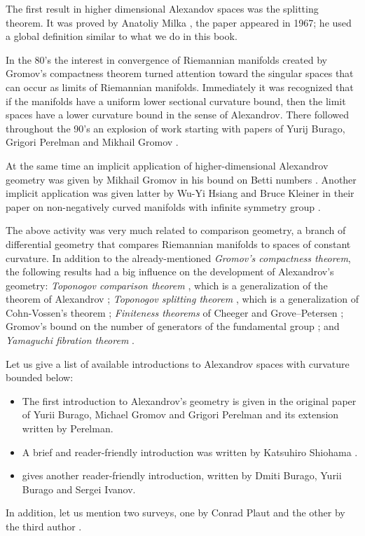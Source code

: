 The first result in higher dimensional Alexandov spaces was the splitting theorem.
It was proved by Anatoliy Milka \cite{milka-line}, the paper appeared in 1967;
he used a global definition similar to what we do in this book.

In the 80's the interest in convergence of Riemannian manifolds created by Gromov's compactness theorem \cite{gromov-MS} turned attention toward the singular spaces that can occur as limits of Riemannian manifolds.
Immediately it was recognized that if the manifolds have a uniform lower sectional curvature bound, then the limit spaces have a lower curvature bound in the sense of Alexandrov. 
There followed throughout the 90's an explosion of work starting with papers of Yurij Burago, Grigori Perelman and Mikhail Gromov  \cite{BGP,perelman:spaces2}.

At the same time an implicit application of higher-dimensional Alexandrov geometry was given by Mikhail Gromov in his bound on Betti numbers \cite{gromov:betti}.
Another implicit application was given latter by Wu-Yi Hsiang and Bruce Kleiner in their paper on non-negatively curved manifolds with infinite symmetry group \cite{hsiang-kleiner}.

The above activity was very much related to comparison geometry,
a branch of differential geometry that compares Riemannian manifolds  to  spaces of constant curvature.
In addition to the already-mentioned \emph{Gromov's compactness theorem},
the following results had a big influence on the development of Alexandrov's geometry:
\emph{Toponogov comparison theorem} \cite{toponogov-globalization+splitting}, which is a generalization of the theorem of Alexandrov \cite{alexandrov-comparison};
\emph{Toponogov splitting theorem} \cite{toponogov-globalization+splitting}, which is a generalization of Cohn-Vossen's theorem \cite{cohn-vossen_line};
\emph{Finiteness theorems} of
Cheeger
and
Grove--Petersen \cite{cheeger-finiteness,grove-petersen:finiteness};
Gromov's bound on the number of generators of the fundamental group 
\cite[1.5]{gomov:almost-flat};
and 
\emph{Yamaguchi fibration theorem} \cite{yamaguchi-fibration}.


Let us give a list of available introductions to  Alexandrov spaces with curvature bounded below: 
\begin{itemize}
\item The first introduction to Alexandrov's geometry is given in the original paper of Yurii Burago, Michael Gromov and Grigori Perelman \cite{BGP} 
and its extension \cite{perelman:spaces2} written by Perelman.
\item A brief and reader-friendly introduction was written by Katsuhiro Shiohama \cite[Sections 1--8]{shiohama}.
\item \cite[Chapter 10]{BBI} gives another reader-friendly introduction, written by Dmiti Burago, Yurii Burago and Sergei Ivanov.
\end{itemize}
In addition, let us mention two surveys, one by Conrad Plaut \cite{plaut:survey} and the other by the third author \cite{petrunin:survey}.

